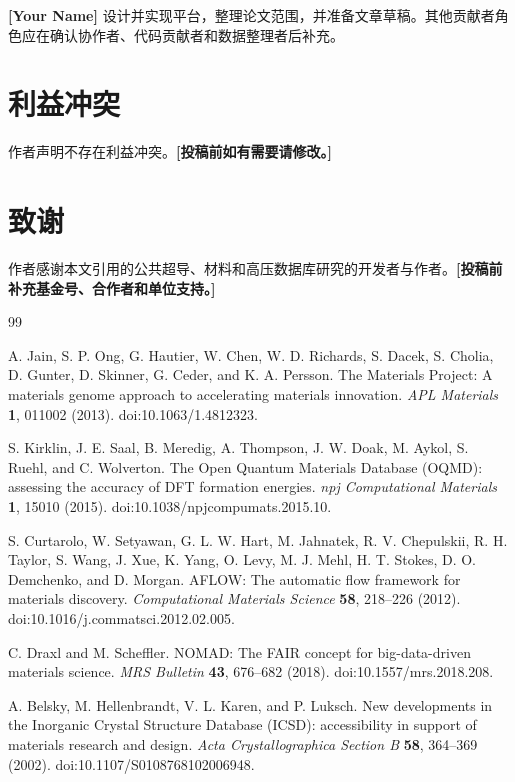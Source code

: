 \documentclass[11pt,a4paper]{ctexart}
\begin{document}
\textbf{[Your Name]} 设计并实现平台，整理论文范围，并准备文章草稿。其他贡献者角色应在确认协作者、代码贡献者和数据整理者后补充。

\section*{利益冲突}

作者声明不存在利益冲突。\textbf{[投稿前如有需要请修改。]}

\section*{致谢}

作者感谢本文引用的公共超导、材料和高压数据库研究的开发者与作者。\textbf{[投稿前补充基金号、合作者和单位支持。]}

\begin{thebibliography}{99}

A. Jain, S. P. Ong, G. Hautier, W. Chen, W. D. Richards, S. Dacek, S. Cholia, D. Gunter, D. Skinner, G. Ceder, and K. A. Persson.
The Materials Project: A materials genome approach to accelerating materials innovation.
\textit{APL Materials} \textbf{1}, 011002 (2013).
doi:10.1063/1.4812323.

S. Kirklin, J. E. Saal, B. Meredig, A. Thompson, J. W. Doak, M. Aykol, S. Ruehl, and C. Wolverton.
The Open Quantum Materials Database (OQMD): assessing the accuracy of DFT formation energies.
\textit{npj Computational Materials} \textbf{1}, 15010 (2015).
doi:10.1038/npjcompumats.2015.10.

S. Curtarolo, W. Setyawan, G. L. W. Hart, M. Jahnatek, R. V. Chepulskii, R. H. Taylor, S. Wang, J. Xue, K. Yang, O. Levy, M. J. Mehl, H. T. Stokes, D. O. Demchenko, and D. Morgan.
AFLOW: The automatic flow framework for materials discovery.
\textit{Computational Materials Science} \textbf{58}, 218--226 (2012).
doi:10.1016/j.commatsci.2012.02.005.

C. Draxl and M. Scheffler.
NOMAD: The FAIR concept for big-data-driven materials science.
\textit{MRS Bulletin} \textbf{43}, 676--682 (2018).
doi:10.1557/mrs.2018.208.

A. Belsky, M. Hellenbrandt, V. L. Karen, and P. Luksch.
New developments in the Inorganic Crystal Structure Database (ICSD): accessibility in support of materials research and design.
\textit{Acta Crystallographica Section B} \textbf{58}, 364--369 (2002).
doi:10.1107/S0108768102006948.


\end{thebibliography}
\end{document}
